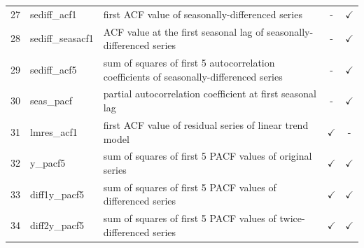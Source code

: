 \documentclass[11pt,a4paper,]{article}
\def\yes{$\checkmark$}
\begin{document}
\begin{table}[!htp]
\begin{tabular}{llp{}cc}
27 & sediff\_acf1   & first ACF value of seasonally-differenced series                                        & -     & \yes\\
28 & sediff\_seasacf1 & ACF value at the first seasonal lag of seasonally-differenced series                    & -     & \yes \\
29 & sediff\_acf5   & sum of squares of first 5 autocorrelation coefficients of seasonally-differenced series & -     & \yes \\
30 & seas\_pacf  & partial autocorrelation coefficient at first seasonal lag                      & -  & \yes \\
31 & lmres\_acf1    & first ACF value of residual series of linear trend model                                & \yes  & - \\
32 & y\_pacf5       & sum of squares of first 5 PACF values of original series                                & \yes  & \yes \\
33 & diff1y\_pacf5  & sum of squares of first 5 PACF values of differenced series                             & \yes  & \yes \\
34 & diff2y\_pacf5  & sum of squares of first 5 PACF values of twice-differenced series                       & \yes  & \yes \\

\bottomrule
 \end{tabular}
\end{table}
\end{document}
